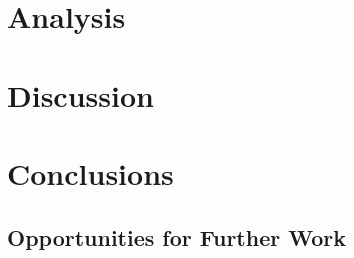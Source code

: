 \documentclass[12pt]{article}
\begin{document}
	\section{Analysis}
	


	\section{Discussion}



	\section{Conclusions}


\subsection{Opportunities for Further Work}
\end{document}
